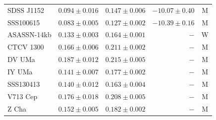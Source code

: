 \begin{table}
\begin{tabular}{lrrrc}
        SDSS J1152      & $0.094\pm0.016$  & $0.147\pm0.006$   & $ -10.07 \pm 0.40$   & M \\
        SSS100615       & $0.083\pm0.005$  & $0.127\pm0.002$   & $ -10.39 \pm 0.16$   & M \\
        ASASSN-14kb     & $0.133\pm0.003$  & $0.164\pm0.001$   & $-$                  & W \\
        CTCV 1300       & $0.166\pm0.006$  & $0.211\pm0.002$   & $-$                  & M \\
        DV UMa          & $0.187\pm0.012$  & $0.215\pm0.005$   & $-$                  & M \\
        IY UMa          & $0.141\pm0.007$  & $0.177\pm0.002$   & $-$                  & M \\
        SSS130413       & $0.140\pm0.012$  & $0.163\pm0.004$   & $-$                  & M \\
        V713 Cep        & $0.176\pm0.018$  & $0.208\pm0.005$   & $-$                  & M \\
        Z Cha           & $0.152\pm0.005$  & $0.182\pm0.002$   & $-$                  & M \\
        \hline
    \end{tabular}
\end{table}

